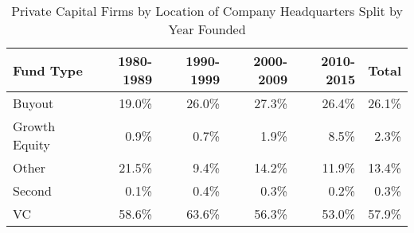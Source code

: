 
\begin{table}[ht]
    \caption{\label{tab:pcritablea2} Private Capital Firms by Location of Company Headquarters Split by Year Founded}\tabularnewline
    
    \begin{tabular}{@{}lrrrrr@{}}
    \toprule
    Fund Type & 1980-1989 & 1990-1999 & 2000-2009 & 2010-2015 & Total\tabularnewline
    \midrule
    Buyout & 19.0\% & 26.0\% & 27.3\% & 26.4\% & 26.1\%\tabularnewline
    Growth Equity & 0.9\% & 0.7\% & 1.9\% & 8.5\% & 2.3\%\tabularnewline
    Other & 21.5\% & 9.4\% & 14.2\% & 11.9\% & 13.4\%\tabularnewline
    Second & 0.1\% & 0.4\% & 0.3\% & 0.2\% & 0.3\%\tabularnewline
    VC & 58.6\% & 63.6\% & 56.3\% & 53.0\% & 57.9\%\tabularnewline
    \bottomrule
    \end{tabular}
\end{table}
 